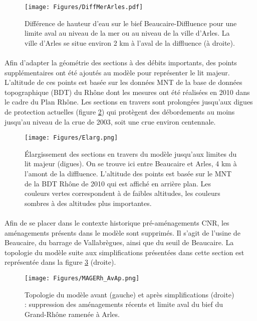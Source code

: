 \documentclass[11pt]{article}
\begin{document}
	\begin{figure}[h]
	\centering
		\texttt{[image: Figures/DiffMerArles.pdf]}
        \caption{Différence de hauteur d'eau sur le bief Beaucaire-Diffluence pour une limite aval au niveau de la mer ou au niveau de la ville d'Arles. La ville d'Arles se situe environ 2 km à l'aval de la diffluence (à droite).}
		\label{fig:DifMerArles}
	\end{figure}			 
	 	
\FloatBarrier

	\paragraph{} Afin d'adapter la géométrie des sections à des débits importants, des points supplémentaires ont été ajoutés au modèle pour représenter le lit majeur. L'altitude de ces points est basée sur les données MNT de la base de données topographique (BDT) du Rhône dont les mesures ont été réalisées en 2010 dans le cadre du Plan Rhône. Les sections en travers sont prolongées jusqu'aux digues de protection actuelles (figure \ref{fig:Elarg}) qui protègent des débordements au moins jusqu'au niveau de la crue de 2003, soit une crue environ centennale. 
	
	\begin{figure}[h]
	\centering
		\texttt{[image: Figures/Elarg.png]}
        \caption{Élargissement des sections en travers du modèle jusqu'aux limites du lit majeur (digues). On se trouve ici entre Beaucaire et Arles, 4 km à l'amont de la diffluence. L'altitude des points est basée sur le MNT de la BDT Rhône de 2010 qui est affiché en arrière plan. Les couleurs vertes correspondent à de faibles altitudes, les couleurs sombres à des altitudes plus importantes.}
		\label{fig:Elarg}
	\end{figure}		
	
	\paragraph{} Afin de se placer dans le contexte historique pré-aménagements CNR, les aménagements présents dans le modèle sont supprimés. Il s'agit de l'usine de Beaucaire, du barrage de Vallabrègues, ainsi que du seuil de Beaucaire. La topologie du modèle suite aux simplifications présentées dans cette section est représentée dans la figure \ref{fig:Mageavap} (droite).
	
	\begin{figure}[h]
	\centering
		\texttt{[image: Figures/MAGERh\_AvAp.png]}
        \caption{Topologie du modèle avant (gauche) et après simplifications (droite) : suppression des aménagements récents et limite aval du bief du Grand-Rhône ramenée à Arles.}
		\label{fig:Mageavap}
	\end{figure}		
	
\end{document}
